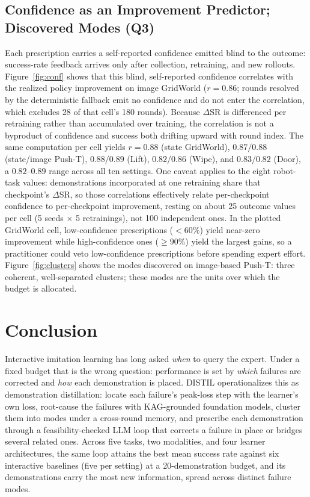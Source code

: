 \documentclass[letterpaper]{article} %
\begin{document}
\subsection{Confidence as an Improvement Predictor; Discovered Modes (Q3)}

Each prescription carries a self-reported confidence emitted blind to the
outcome: success-rate feedback arrives only after collection, retraining,
and new rollouts. Figure~\ref{fig:conf} shows that this blind,
self-reported confidence correlates with the realized policy improvement on
image GridWorld ($r=0.86$; rounds resolved by the deterministic fallback
emit no confidence and do not enter the correlation, which excludes 28 of
that cell's 180 rounds). Because $\Delta$SR is differenced per retraining
rather than accumulated over training, the correlation is not a byproduct
of confidence and success both drifting upward with round index. The same
computation per cell yields $r=0.88$
(state GridWorld), $0.87/0.88$ (state/image Push-T), $0.88/0.89$ (Lift),
$0.82/0.86$ (Wipe), and $0.83/0.82$ (Door), a $0.82$--$0.89$ range across
all ten settings. One caveat applies to the eight robot-task values:
demonstrations incorporated at one retraining share that checkpoint's
$\Delta$SR, so those correlations effectively relate per-checkpoint
confidence to per-checkpoint improvement, resting on about 25 outcome
values per cell (5 seeds $\times$ 5 retrainings), not 100 independent
ones. In the plotted GridWorld cell, low-confidence prescriptions
($<60\%$) yield near-zero improvement while high-confidence ones
($\ge 90\%$) yield the largest gains, so a practitioner could veto
low-confidence prescriptions before spending expert effort.
Figure~\ref{fig:clusters} shows the modes discovered on image-based Push-T:
three coherent, well-separated clusters; these modes are the units over
which the budget is allocated.

\section{Conclusion}
\label{sec:conclusion}

Interactive imitation learning has long asked \emph{when} to query the
expert. Under a fixed budget that is the wrong question: performance is set
by \emph{which} failures are corrected and \emph{how} each demonstration is
placed. DISTIL operationalizes this as demonstration distillation: locate
each failure's peak-loss step with the learner's own loss, root-cause the
failures with KAG-grounded
foundation models, cluster them into modes under a cross-round memory, and
prescribe each demonstration through a feasibility-checked LLM loop that
corrects a failure in place or bridges several related ones.
Across five tasks, two modalities, and four learner architectures, the
same loop attains the best mean success rate against six interactive
baselines (five per setting) at a 20-demonstration budget, and its
demonstrations carry the most new information, spread across distinct
failure modes.
\end{document}
